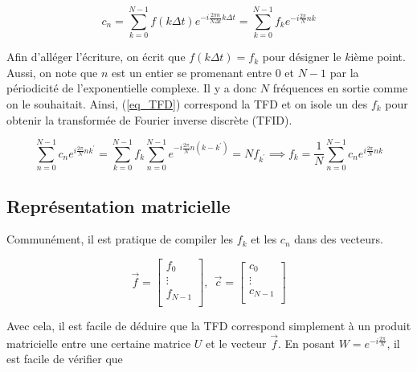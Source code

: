 \begin{equation}
    c_n = \sum_{k=0}^{N-1}f(k\Delta t)e^{-i\frac{2\pi n}{N\Delta t}k\Delta t} = \sum_{k=0}^{N-1}f_ke^{-i\frac{2\pi}{N}nk}
    \label{eq_TFD}
\end{equation}

Afin d'alléger l'écriture, on écrit que $f(k\Delta t) = f_k$ pour désigner le $k$ième point. Aussi, on note que $n$ est un entier se promenant entre 0 et $N-1$ par la périodicité de l'exponentielle complexe. Il y a donc $N$ fréquences en sortie comme on le souhaitait. Ainsi, (\ref{eq_TFD}) correspond la TFD et on isole un des $f_k$ pour obtenir la transformée de Fourier inverse discrète (TFID).

\begin{equation}
    \sum_{n=0}^{N-1}c_n e^{i\frac{2\pi}{N}nk^{'}} = \sum_{k=0}^{N-1}f_k\sum_{n=0}^{N-1} e^{-i\frac{2\pi}{N}n(k-k^{'})} = Nf_{k^{'}} \implies f_k = \frac{1}{N}\sum_{n=0}^{N-1}c_n e^{i\frac{2\pi}{N}nk}
    \label{eq_TFID}
\end{equation}

\subsection{Représentation matricielle}
Communément, il est pratique de compiler les $f_k$ et les $c_n$ dans des vecteurs.

\begin{equation*}
    \vec{f} = 
    \begin{bmatrix}
        f_0 \\
        \vdots \\
        f_{N-1} \\
    \end{bmatrix}, \ \
    \vec{c} = 
    \begin{bmatrix}
        c_0 \\
        \vdots \\
        c_{N-1} \\
    \end{bmatrix}
\end{equation*}

Avec cela, il est facile de déduire que la TFD correspond simplement à un produit matricielle entre une certaine matrice $U$ et le vecteur $\vec{f}$. En posant $W = e^{-i\frac{2\pi}{N}}$, il est facile de vérifier que 

